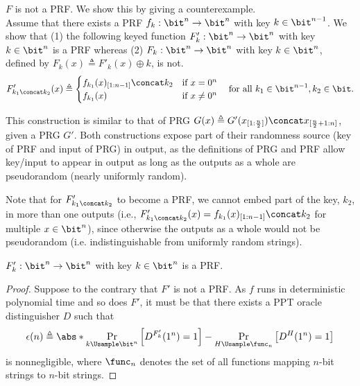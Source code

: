 \begin{answer}[c]
    $F$ is not a PRF. We show this by giving a counterexample.\\
    Assume that there exists a PRF $f_k:\bit^n\to\bit^n$ with key $k\in \bit^{n-1}$. We show that (1) the following keyed function $F'_k:\bit^n\to \bit^n$ with key $k\in\bit^n$ is a PRF whereas (2) $F_k:\bit^n\to \bit^n$ with key $k\in\bit^n$, defined by $F_k(x)\triangleq F'_k(x)\oplus k$, is not.
    \[
        F'_{k_1\concat k_2}(x)\triangleq \begin{cases}
            f_{k_1}(x)_{[1:n-1]} \concat k_2 &\textrm{if } x=0^n\\
            f_{k_1}(x) &\textrm{if } x\neq 0^n\\
        \end{cases}
        \quad\textrm{for all } k_1\in\bit^{n-1}, k_2\in\bit.
    \]
    \begin{intuition}
        This construction is similar to that of PRG $G(x)\triangleq G'(x_{[1:\frac{n}{2}]})\concat x_{[\frac{n}{2}+1:n]}$, given a PRG $G'$. Both constructions expose part of their randomness source (key of PRF and input of PRG) in output, as the definitions of PRG and PRF allow key/input to appear in output as long as the outputs as a whole are pseudorandom (nearly uniformly random). 
        
        Note that for $F'_{k_1\concat k_2}$ to become a PRF, we cannot embed part of the key, $k_2$, in more than one outputs (i.e., $F'_{k_1\concat k_2}(x)=f_{k_1}(x)_{[1:n-1]} \concat k_2$ for multiple $x\in\bit^n$), since otherwise the outputs as a whole would not be pseudorandom (i.e. indistinguishable from uniformly random strings). 
    \end{intuition}

    \begin{claim}\label{claim:p2-3-1}
         $F'_k:\bit^n\to \bit^n$ with key $k\in\bit^n$ is a PRF.
    \end{claim}
    \begin{proof}
        Suppose to the contrary that $F'$ is not a PRF. As $f$ runs in deterministic polynomial time and so does $F'$, it must be that there exists a PPT oracle distinguisher $D$ such that
        \begin{equation}\label{eq:p2-3-1}
            \epsilon(n)\triangleq \abs*{\Pr_{k\Usample\bit^n}\left[D^{F'_k}(1^n)=1\right] - \Pr_{H\Usample\func_n}\left[D^{H}(1^n)=1\right]} 
        \end{equation}
        is nonnegligible, where $\func_n$ denotes the set of all functions mapping $n$-bit strings to $n$-bit strings.


\end{proof}
\end{answer}
